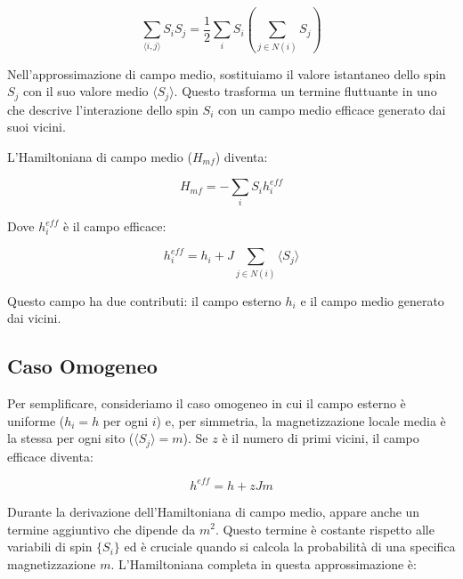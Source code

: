 \begin{equation} \label{eq:ch17_2}
\sum_{\langle i,j \rangle} S_i S_j = \frac{1}{2} \sum_i S_i \left( \sum_{j \in N(i)} S_j \right)
\end{equation}

Nell'approssimazione di campo medio, sostituiamo il valore istantaneo dello spin $S_j$ con il suo valore medio $\langle S_j \rangle$. Questo trasforma un termine fluttuante in uno che descrive l'interazione dello spin $S_i$ con un campo medio efficace generato dai suoi vicini.

L'Hamiltoniana di campo medio ($H_{mf}$) diventa:

\begin{equation} \label{eq:ch17_3}
H_{mf} = -\sum_i S_i h_i^{eff}
\end{equation}

Dove $h_i^{eff}$ è il campo efficace:

\begin{equation} \label{eq:ch17_4}
h_i^{eff} = h_i + J \sum_{j \in N(i)} \langle S_j \rangle
\end{equation}

Questo campo ha due contributi: il campo esterno $h_i$ e il campo medio generato dai vicini.

\subsection*{Caso Omogeneo}
Per semplificare, consideriamo il caso omogeneo in cui il campo esterno è uniforme ($h_i = h$ per ogni $i$) e, per simmetria, la magnetizzazione locale media è la stessa per ogni sito ($\langle S_j \rangle = m$). Se $z$ è il numero di primi vicini, il campo efficace diventa:

\begin{equation} \label{eq:ch17_5}
h^{eff} = h + zJm
\end{equation}

Durante la derivazione dell'Hamiltoniana di campo medio, appare anche un termine aggiuntivo che dipende da $m^2$. Questo termine è costante rispetto alle variabili di spin $\{S_i\}$ ed è cruciale quando si calcola la probabilità di una specifica magnetizzazione $m$. L'Hamiltoniana completa in questa approssimazione è:

\vspace{0.5cm}
\noindent{}
\vspace{0.5cm}

